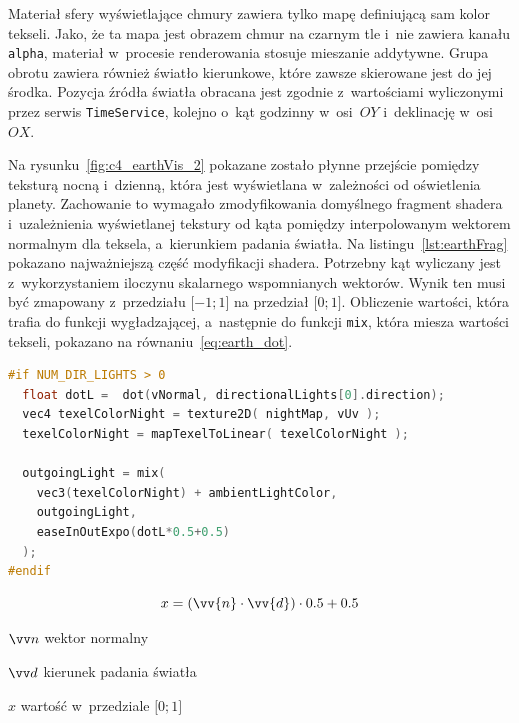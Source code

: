 Materiał sfery wyświetlające chmury zawiera tylko mapę definiującą sam kolor tekseli. Jako, że ta mapa jest obrazem chmur na czarnym tle i~nie zawiera kanału \texttt{alpha}, materiał w~procesie renderowania stosuje mieszanie addytywne. Grupa obrotu zawiera również światło kierunkowe, które zawsze skierowane jest do jej środka. Pozycja źródła światła obracana jest zgodnie z~wartościami wyliczonymi przez serwis \texttt{TimeService}, kolejno o~kąt godzinny w~osi~$OY$ i~deklinację w~osi~$OX$.

Na rysunku~\ref{fig:c4_earthVis_2} pokazane zostało płynne przejście pomiędzy teksturą nocną i~dzienną, która jest wyświetlana w~zależności od oświetlenia planety. Zachowanie to wymagało zmodyfikowania domyślnego fragment shadera i~uzależnienia wyświetlanej tekstury od kąta pomiędzy interpolowanym wektorem normalnym dla teksela, a~kierunkiem padania światła. Na listingu~\ref{lst:earthFrag} pokazano najważniejszą część modyfikacji shadera. Potrzebny kąt wyliczany jest z~wykorzystaniem iloczynu skalarnego wspomnianych wektorów. Wynik ten musi być zmapowany z~przedziału $\lbrack-1; 1\rbrack$ na przedział $\lbrack0; 1\rbrack$. Obliczenie wartości, która trafia do funkcji wygładzającej, a~następnie do funkcji \texttt{mix}, która miesza wartości tekseli, pokazano na równaniu~\ref{eq:earth_dot}.

\begin{lstlisting}[float=h, language=C++, label={lst:earthFrag}, caption={
  Modyfikacja fragment shadera materiału \texttt{MeshPhongMaterial}}
]
#if NUM_DIR_LIGHTS > 0
  float dotL =  dot(vNormal, directionalLights[0].direction);
  vec4 texelColorNight = texture2D( nightMap, vUv );
  texelColorNight = mapTexelToLinear( texelColorNight );

  outgoingLight = mix(
    vec3(texelColorNight) + ambientLightColor,
    outgoingLight,
    easeInOutExpo(dotL*0.5+0.5)
  );
#endif
\end{lstlisting}
\begin{equation}
  \label{eq:earth_dot}
  x = (\vv{n} \cdot \vv{d}) \cdot 0.5 + 0.5
\end{equation}
\begin{eqexpl}[25mm]
\item {$\vv n$} wektor normalny
\item {$\vv d$} kierunek padania światła
\item {$x$} wartość w~przedziale $\lbrack0; 1\rbrack$
\end{eqexpl}
\vspace{\baselineskip}

